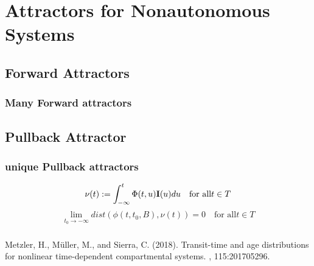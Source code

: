 
\section{Attractors for {\color{red}Non}autonomous Systems}
\subsection{Forward Attractors}
\begin{frame}
  \frametitle{\alert{Many} Forward attractors}
\end{frame}

\subsection{Pullback Attractor}
\begin{frame}
  \frametitle{\alert{unique} Pullback attractors}
  \[
    \nu(t):=\int_{-\infty}^t \Phi(t,u) \mathbf{I}(u) du \quad \text{for all} t \in T
  \]
  \[
    \lim_{t_0 \rightarrow -\infty} dist(\phi(t,t_0,B),{\nu(t)})=0 \quad \text{for all} t \in T
  \]
\end{frame}

\begin{frame}
  \frametitle{}
	\begin{thebibliography}{}
	Metzler, H., M{\"u}ller, M., and Sierra, C. (2018).
	\newblock Transit-time and age distributions for nonlinear time-dependent
	  compartmental systems.
	, 115:201705296.
	\end{thebibliography}
\end{frame}


